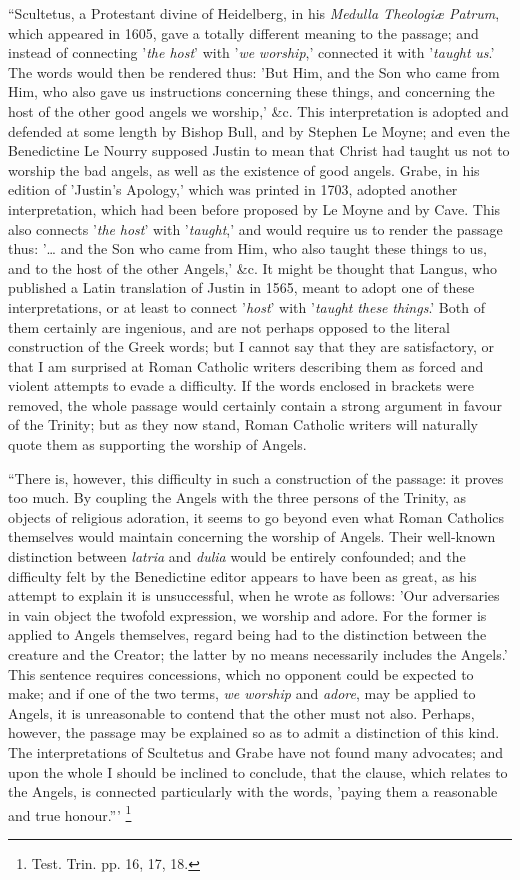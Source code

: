``Scultetus, a Protestant divine of Heidelberg, in his \emph{Medulla
Theologiæ Patrum}, which appeared in 1605, gave a totally
different meaning to the passage; and instead of connecting '\emph{the
host}' with '\emph{we} \emph{worship},' connected it with '\emph{taught}
\emph{us}.' The words would then be rendered thus: 'But Him, and the
Son who came from Him, who also gave us instructions concerning these
things, and concerning the host of the other good angels we worship,'
\&c. This interpretation is adopted and defended at some length by
Bishop Bull, and by Stephen Le Moyne; and even the Benedictine Le
Nourry supposed Justin to mean that Christ had taught us not to
worship the bad angels, as well as the existence of good angels. Grabe,
in his edition of 'Justin's Apology,' which was printed in 1703,
adopted another interpretation, which had been before proposed by Le
Moyne and by Cave. This also connects '\emph{the} \emph{host}' with '\emph{taught},'
and would require us to render the passage thus: '… and the Son who
came from Him, who also taught these things to us, and to the host of
the other Angels,' \&c. It might be thought that Langus, who published a Latin translation of Justin in 1565, meant to adopt one of
these interpretations, or at least to connect '\emph{host}' with '\emph{taught}
\emph{these} \emph{things}.' Both of them certainly are ingenious, and
are not perhaps opposed to the literal construction of the Greek
words; but I cannot say that they are satisfactory, or that I am
surprised at Roman Catholic writers describing them as forced and
violent attempts to evade a difficulty. If the words enclosed in
brackets were removed, the whole passage would certainly contain a
strong argument in favour of the Trinity; but as they now stand, Roman
Catholic writers will naturally quote them as supporting the worship
of Angels.

``There is, however, this difficulty in such a construction of
the passage: it proves too much. By coupling the Angels with the three
persons of the Trinity, as objects of religious adoration, it seems to
go beyond even what Roman Catholics themselves would maintain
concerning the worship of Angels. Their well-known distinction between
\emph{latria} and \emph{dulia} would be entirely confounded; and the
difficulty felt by the Benedictine editor appears to have been as
great, as his attempt to explain it is unsuccessful, when he wrote as
follows: 'Our adversaries in vain object the twofold expression, we
worship and adore. For the former is applied to Angels themselves,
regard being had to the distinction between the creature and the
Creator; the latter by no means necessarily includes the Angels.' This
sentence requires concessions, which no opponent could be expected to
make; and if one of the two terms, \emph{we worship} and \emph{adore},
may be applied to Angels, it is unreasonable to contend that the other
must not also. Perhaps, however, the passage may be explained so as to
admit a distinction of this kind. The interpretations of Scultetus and
Grabe have not found many advocates; and upon the whole I should be
inclined to conclude, that the clause, which relates to the Angels, is
connected particularly with the words, 'paying them a reasonable and
true honour.''' \footnote{Test. Trin. pp. 16, 17, 18.}

